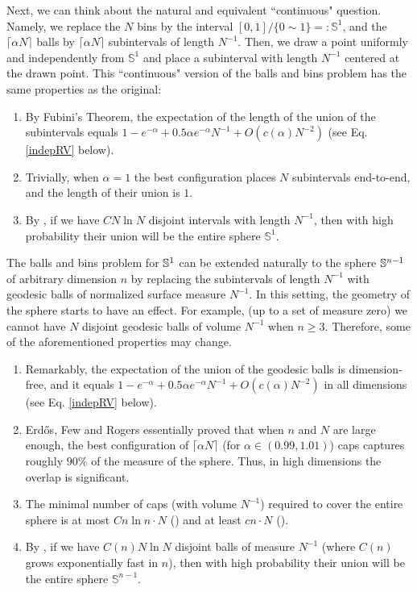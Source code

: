 Next, we can think about the natural and equivalent ``continuous" question. Namely, we replace the $N$ bins by the interval $[0,1]/\{0 \sim 1\} =: \mathbb{S}^{1}$, and the $\lceil \alpha N \rceil$ balls by $\lceil \alpha N \rceil$ subintervals of length $N^{-1}$. Then, we draw a point uniformly and independently from $\mathbb{S}^{1}$ and  place a subinterval with length $N^{-1}$ centered at the drawn point. This ``continuous" version of the balls and bins problem has the same properties as the original: %
\begin{enumerate}
	\item By Fubini's Theorem, the expectation of the length of the union of the subintervals equals $1-e^{-\alpha} + 0.5\alpha e^{-\alpha}N^{-1} + O( c(\alpha)N^{-2})$ (see Eq. \eqref{indepRV} below).%
	\item Trivially, when $\alpha=1$ the best configuration places $N$ subintervals end-to-end, and the length of their union is $1$.
	\item By \cite[Theorem 1.2]{janson1986random}, if we have $CN\ln N$ disjoint intervals with length $N^{-1}$, then with high probability their union will be the entire sphere $\mathbb{S}^{1}$.
\end{enumerate}

The  balls and bins problem for $\Bbb{S}^1$ can be extended naturally to the sphere $\mathbb{S}^{n-1}$ of  arbitrary dimension $n$ by replacing the subintervals of length $N^{-1}$ with geodesic balls of normalized surface measure $N^{-1}$. In this setting, the geometry of the sphere starts to have an effect. %
For example, (up to a set of measure zero) we cannot have $N$ disjoint geodesic balls of volume $N^{-1}$ when $n \geq 3$. Therefore, some of the aforementioned properties may change.
\begin{enumerate}
	\item Remarkably, the expectation of the union of the geodesic balls is dimension-free, and it equals $1-e^{-\alpha} + 0.5\alpha e^{-\alpha }N^{-1} + O( c(\alpha) N^{-2})$ in all dimensions  (see Eq. \eqref{indepRV} below).
	\item  Erd{\H{o}}s, Few and Rogers \cite{erdHos1964amount} essentially proved that when $n$ and $N$ are large enough, the best configuration of $\lceil\alpha N\rceil$ (for $\alpha \in (0.99,1.01)$) caps captures roughly $90\%$ of the measure of the sphere. Thus, in high dimensions the overlap is significant.
	\item  The minimal number of caps (with volume $N^{-1}$) required to cover the entire sphere is at most $Cn\ln n \cdot N$ (\cite{rogers1957note,boroczky2003covering}) and at least $cn\cdot N$ (\cite{rogers1963covering}). 
	\item By \cite[Theorem 1.2]{janson1986random}, if we have $C(n)N\ln N$ disjoint balls of measure $N^{-1}$ (where $C(n)$ grows exponentially fast in $n$), then with high probability their union will be the entire sphere $\mathbb{S}^{n-1}$. 
\end{enumerate}

